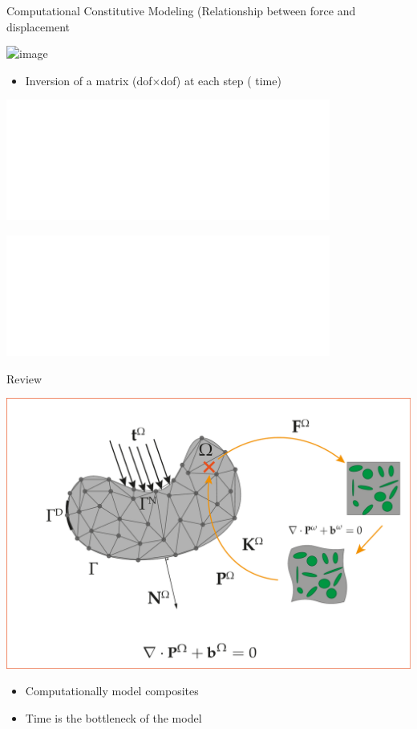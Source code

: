 \documentclass[aspectratio=169]{beamer}
\begin{document}
\begin{frame}{Computational Constitutive Modeling (Relationship between force and displacement}
\begin{minipage}{0.5\textwidth}

  \includegraphics<1-2>[width=\textwidth]{Figures/intro/link.png} 
  {
    \begin{itemize}
      \item Inversion of a matrix (dof$\times$dof) at each step (\color{Pink} time\color{Black}) 
    \end{itemize}
  }
\end{minipage}%
\begin{minipage}{0.5\textwidth}

  \includegraphics<2>[width=0.8\textwidth]{Figures/intro/rve81.pdf} 

  \includegraphics<3>[width=0.8\textwidth]{Figures/intro/nonlinear.pdf} 
\end{minipage}
\end{frame}

\begin{frame}{Review}
\begin{minipage}{0.5\textwidth}
  \includegraphics[width=\textwidth]{Figures/FE2.pdf}
\end{minipage}%
\begin{minipage}{0.5\textwidth}
  \begin{itemize}
    \item Computationally model composites
    \item Time is the bottleneck of the model
  \end{itemize}
\end{minipage}
\end{frame}
\end{document}
